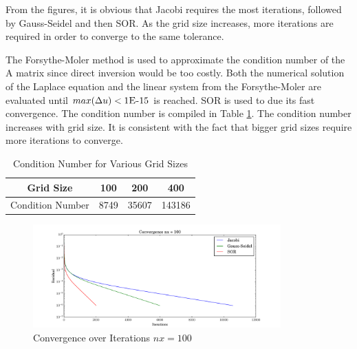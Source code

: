 \documentclass[letterpaper,12pt,]{article}
\begin{document}
From the figures, it is obvious that Jacobi requires the most iterations, followed by Gauss-Seidel and then SOR. As the grid size increases, more iterations are required in order to converge to the same tolerance.

The Forsythe-Moler method is used to approximate the condition number of the A matrix since direct inversion would be too costly.
Both the numerical solution of the Laplace equation and the linear system from the Forsythe-Moler are evaluated until $max(\Delta u) < 1\textsc{E-}15$ is reached.
SOR is used to due its fast convergence.
The condition number is compiled in Table \ref{tab1}.
The condition number increases with grid size. It is consistent with the fact that bigger grid sizes require more iterations to converge.
\begin{table}[h]
\centering
\begin{tabular}{cccc} \toprule
    {Grid Size} & {100} & {200} & {400}\\ \midrule
    {Condition Number} &8749 & 35607 & 143186\\
\bottomrule
\end{tabular}
\caption{Condition Number for Various Grid Sizes}
\label{tab1}
\end{table}


\begin{figure}[!h]
    \centering
    \includegraphics[width = 0.85\textwidth]{./Figures/Conv100.pdf}
    \caption{Convergence over Iterations $nx = 100$}
    \label{fig:conv100}
\end{figure}
\end{document}
